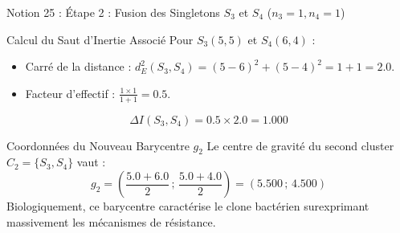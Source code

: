 \documentclass[aspectratio=169,10pt]{beamer}
\begin{document}
\begin{frame}{Notion 25 : Étape 2 : Fusion des Singletons $S_3$ et $S_4$ ($n_3 = 1, n_4 = 1$)}
  \begin{conceptbox}{Calcul du Saut d'Inertie Associé}
    \footnotesize
    Pour $S_3(5,5)$ et $S_4(6,4)$ :
    \begin{itemize}
      \item Carré de la distance : $d_E^2(S_3, S_4) = (5 - 6)^2 + (5 - 4)^2 = 1 + 1 = 2.0$.
      \item Facteur d'effectif : $\frac{1 \times 1}{1 + 1} = 0.5$.
    \end{itemize}
    \begin{equation*}
      \Delta I(S_3, S_4) = 0.5 \times 2.0 = \mathbf{1.000}
    \end{equation*}
  \end{conceptbox}
  \vspace{1mm}
  \begin{biobox}{Coordonnées du Nouveau Barycentre $g_2$}
    \footnotesize
    Le centre de gravité du second cluster $C_2 = \{S_3, S_4\}$ vaut :
    \begin{equation*}
      g_2 = \left( \frac{5.0 + 6.0}{2} \,;\, \frac{5.0 + 4.0}{2} \right) = (\mathbf{5.500} \,;\, \mathbf{4.500})
    \end{equation*}
    Biologiquement, ce barycentre caractérise le clone bactérien surexprimant massivement les mécanismes de résistance.
  \end{biobox}
\end{frame}
\end{document}
